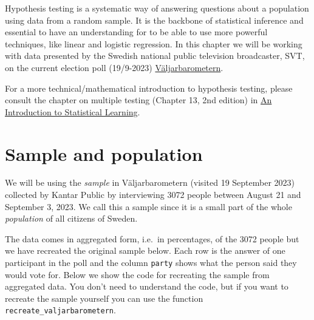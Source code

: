 \documentclass[
  letterpaper,
  DIV=11,
  numbers=noendperiod]{scrreprt}
\begin{document}
Hypothesis testing is a systematic way of answering questions about a
population using data from a random sample. It is the backbone of
statistical inference and essential to have an understanding for to be
able to use more powerful techniques, like linear and logistic
regression. In this chapter we will be working with data presented by
the Swedish national public television broadcaster, SVT, on the current
election poll (19/9-2023)
\href{https://www.svt.se/special/valjarbarometern/}{Väljarbarometern}.

For a more technical/mathematical introduction to hypothesis testing,
please consult the chapter on multiple testing (Chapter 13, 2nd edition)
in \href{https://www.statlearning.com/}{An Introduction to Statistical
Learning}.

\section{Sample and population}\label{sample-and-population}

We will be using the \emph{sample} in Väljarbarometern (visited 19
September 2023) collected by Kantar Public by interviewing 3072 people
between August 21 and September 3, 2023. We call this a sample since it
is a small part of the whole \emph{population} of all citizens of
Sweden.

{The data comes in aggregated form, i.e.~in percentages, of the 3072
people but we have recreated the original sample below. Each row is the
answer of one participant in the poll and the column \texttt{party}
shows what the person said they would vote for. Below we show the code
for recreating the sample from aggregated data. You don't need to
understand the code, but if you want to recreate the sample yourself you
can use the function \texttt{recreate\_valjarbarometern}.}
\end{document}
